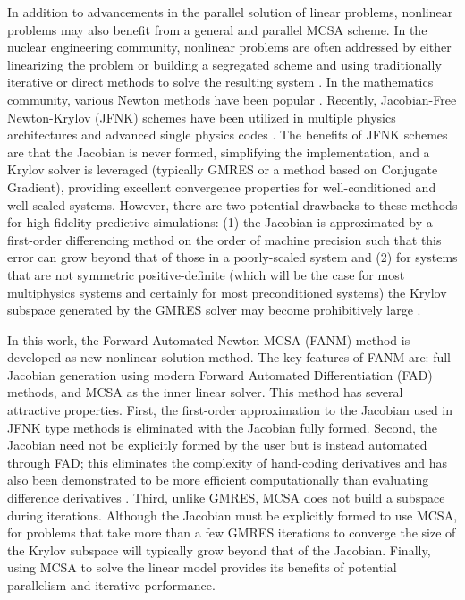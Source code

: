 In addition to advancements in the parallel solution of linear
problems, nonlinear problems may also benefit from a general and
parallel MCSA scheme. In the nuclear engineering community, nonlinear
problems are often addressed by either linearizing the problem or
building a segregated scheme and using traditionally iterative or
direct methods to solve the resulting system
\cite{pletcher_computational_1997}. In the mathematics community,
various Newton methods have been popular
\cite{kelley_iterative_1995}. Recently, Jacobian-Free Newton-Krylov
(JFNK) schemes \cite{knoll_jacobian-free_2004} have been utilized in
multiple physics architectures and advanced single physics codes
\cite{gaston_parallel_2009}. The benefits of JFNK schemes are that the
Jacobian is never formed, simplifying the implementation, and a Krylov
solver is leveraged (typically GMRES or a method based on Conjugate
Gradient), providing excellent convergence properties for
well-conditioned and well-scaled systems. However, there are two
potential drawbacks to these methods for high fidelity predictive
simulations: (1) the Jacobian is approximated by a first-order
differencing method on the order of machine precision such that this
error can grow beyond that of those in a poorly-scaled system
\cite{kelley_iterative_1995} and (2) for systems that are not
symmetric positive-definite (which will be the case for most
multiphysics systems and certainly for most preconditioned systems)
the Krylov subspace generated by the GMRES solver may become
prohibitively large \cite{knoll_newton-krylov_1995}.

In this work, the Forward-Automated Newton-MCSA (FANM) method is
developed as new nonlinear solution method. The key features of FANM
are: full Jacobian generation using modern Forward Automated
Differentiation (FAD) methods, and MCSA as the inner linear
solver. This method has several attractive properties. First, the
first-order approximation to the Jacobian used in JFNK type methods is
eliminated with the Jacobian fully formed. Second, the Jacobian need
not be explicitly formed by the user but is instead automated through
FAD; this eliminates the complexity of hand-coding derivatives and has
also been demonstrated to be more efficient computationally than
evaluating difference derivatives
\cite{bartlett_automatic_2006}. Third, unlike GMRES, MCSA does not
build a subspace during iterations. Although the Jacobian must be
explicitly formed to use MCSA, for problems that take more than a few
GMRES iterations to converge the size of the Krylov subspace will
typically grow beyond that of the Jacobian. Finally, using MCSA to
solve the linear model provides its benefits of potential parallelism
and iterative performance.

